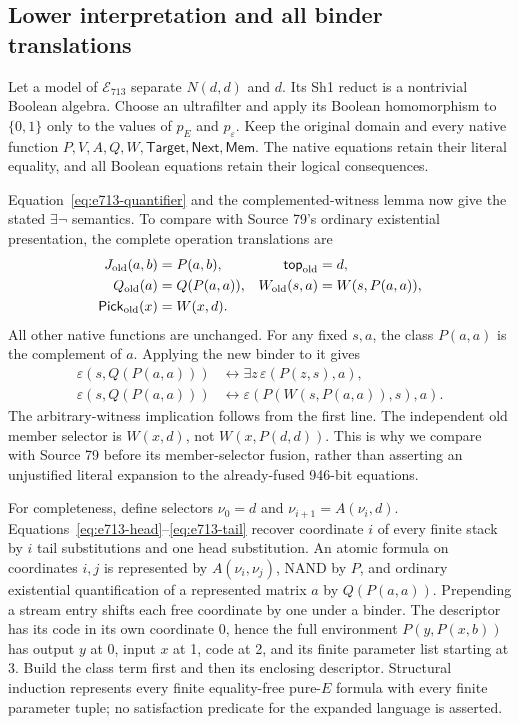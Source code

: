 \subsection{Lower interpretation and all binder translations}

Let a model of $\mathcal E_{713}$ separate $N(d,d)$ and $d$. Its
Sh1 reduct is a nontrivial Boolean algebra. Choose an ultrafilter and
apply its Boolean homomorphism to $\{0,1\}$ only to the values of
$p_E$ and $p_\varepsilon$. Keep the original domain and every native
function $P,V,A,Q,W,\mathsf{Target},\mathsf{Next},\mathsf{Mem}$.
The native equations retain their literal equality, and all Boolean
equations retain their logical consequences.

Equation~\eqref{eq:e713-quantifier} and the complemented-witness lemma
now give the stated $\exists\neg$ semantics. To compare with Source 79's
ordinary existential presentation, the complete operation translations are
\begin{align*}
 J_{\rm old}(a,b)&=P(a,b),&\mathsf{top}_{\rm old}&=d,\\
 Q_{\rm old}(a)&=Q(P(a,a)),&
 W_{\rm old}(s,a)&=W(s,P(a,a)),\\
 \mathsf{Pick}_{\rm old}(x)&=W(x,d).&&
\end{align*}
All other native functions are unchanged. For any fixed $s,a$, the class
$P(a,a)$ is the complement of $a$. Applying the new binder to it gives
\begin{align*}
 \varepsilon(s,Q(P(a,a)))&\longleftrightarrow
       \exists z\,\varepsilon(P(z,s),a),\\
 \varepsilon(s,Q(P(a,a)))&\longleftrightarrow
       \varepsilon(P(W(s,P(a,a)),s),a).
\end{align*}
The arbitrary-witness implication follows from the first line.
The independent old member selector is $W(x,d)$, not
$W(x,P(d,d))$. This is why we compare with Source 79 before its
member-selector fusion, rather than asserting an unjustified literal
expansion to the already-fused 946-bit equations.

For completeness, define selectors $\nu_0=d$ and
$\nu_{i+1}=A(\nu_i,d)$. Equations~\eqref{eq:e713-head}--\eqref{eq:e713-tail}
recover coordinate $i$ of every finite stack by $i$ tail substitutions
and one head substitution. An atomic formula on coordinates $i,j$ is
represented by $A(\nu_i,\nu_j)$, NAND by $P$, and ordinary existential
quantification of a represented matrix $a$ by $Q(P(a,a))$. Prepending
a stream entry shifts each free coordinate by one under a binder.
The descriptor has its code in its own coordinate 0, hence the full
environment $P(y,P(x,b))$ has output $y$ at 0, input $x$ at 1, code at 2,
and its finite parameter list starting at 3. Build the class term first
and then its enclosing descriptor. Structural induction represents every
finite equality-free pure-$E$ formula with every finite parameter tuple;
no satisfaction predicate for the expanded language is asserted.

